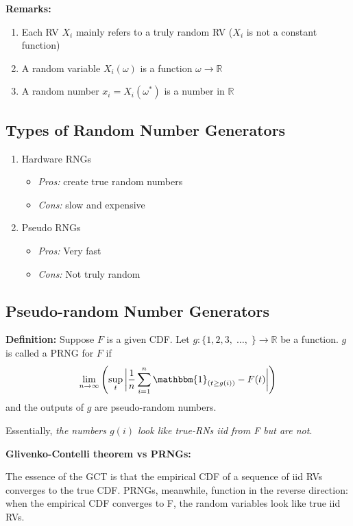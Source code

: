 \documentclass[12pt]{article}
\newcommand{\R}{\mathbb{R}}
\newcommand{\ind}{\mathbbm{1}}
\newcommand{\ellipsis}{\; \dots, \;}
\begin{document}
\textbf{Remarks:}
\begin{enumerate}
    \item Each RV $X_i$ mainly refers to a truly random RV ($X_i$ is not a constant function)
    \item A random variable $X_i(\omega)$ is a function $\omega \to \R$
    \item A random number $x_i = X_i(\omega^*)$ is a number in $\R$
\end{enumerate}

\subsection*{Types of Random Number Generators}
\begin{enumerate}
    \item Hardware RNGs
    \begin{itemize}
        \item \emph{Pros:} create true random numbers
        \item \emph{Cons:} slow and expensive
    \end{itemize}

    \item Pseudo RNGs
    \begin{itemize}
        \item \emph{Pros:} Very fast 
        \item \emph{Cons:} Not truly random
    \end{itemize}
\end{enumerate}

\subsection*{Pseudo-random Number Generators}
\textbf{Definition:} Suppose $F$ is a given CDF. Let $g: \{1, 2, 3, \ellipsis\} \to \R$ be a function. $g$ is called a PRNG for $F$ if 
\[\lim_{n\to \infty} \left(\sup_t\bigg \vert \frac{1}{n}\sum_{i=1}^n \ind_{(t \geq g(i))} - F(t) \bigg \vert\right)\]
and the outputs of $g$ are pseudo-random numbers.

Essentially, \emph{the numbers $g(i)$ look like true-RNs iid from F but are not}.

\textbf{Glivenko-Contelli theorem vs PRNGs:}

The essence of the GCT is that the empirical CDF of a sequence of iid RVs converges to the true CDF. PRNGs, meanwhile, function in the reverse direction: when the empirical CDF converges to F, the random variables look like true iid RVs. 
\end{document}
